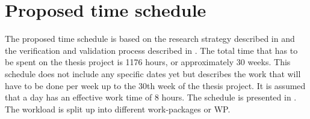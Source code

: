 \chapter{Proposed time schedule} %
\label{ch:prop_time_sche}
The proposed time schedule is based on the research strategy described in  and the verification and validation process described in . The total time that has to be spent on the thesis project is 1176 hours, or approximately 30 weeks. This schedule does not include any specific dates yet but describes the work that will have to be done per week up to the 30th week of the thesis project. It is assumed that a day has an effective work time of 8 hours. The schedule is presented in . The workload is split up into different work-packages or WP.

